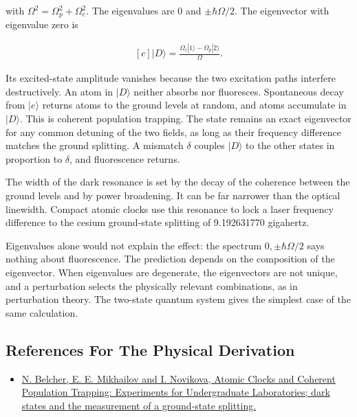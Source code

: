 \documentclass[11pt,oneside]{book}
\newenvironment{centeredalign}{\[\begin{gathered}[c]}{\end{gathered}\]}
\begin{document}
with \(\Omega^2=\Omega_p^2+\Omega_c^2\). The eigenvalues are \(0\) and \(\pm\hbar\Omega/2\). The eigenvector with eigenvalue zero is

\begin{centeredalign}
|D\rangle=\frac{\Omega_c|1\rangle-\Omega_p|2\rangle}{\Omega}.
\end{centeredalign}

Its excited-state amplitude vanishes because the two excitation paths interfere destructively. An atom in \(|D\rangle\) neither absorbs nor fluoresces. Spontaneous decay from \(|e\rangle\) returns atoms to the ground levels at random, and atoms accumulate in \(|D\rangle\). This is coherent population trapping. The state remains an exact eigenvector for any common detuning of the two fields, as long as their frequency difference matches the ground splitting. A mismatch \(\delta\) couples \(|D\rangle\) to the other states in proportion to \(\delta\), and fluorescence returns.

The width of the dark resonance is set by the decay of the coherence between the ground levels and by power broadening. It can be far narrower than the optical linewidth. Compact atomic clocks use this resonance to lock a laser frequency difference to the cesium ground-state splitting of 9.192631770 gigahertz.

Eigenvalues alone would not explain the effect: the spectrum \(0,\pm\hbar\Omega/2\) says nothing about fluorescence. The prediction depends on the composition of the eigenvector. When eigenvalues are degenerate, the eigenvectors are not unique, and a perturbation selects the physically relevant combinations, as in perturbation theory. The two-state quantum system gives the simplest case of the same calculation.

\subsection*{References For The Physical Derivation}
\begin{itemize}
\item \href{https://arxiv.org/abs/0810.2071}{N. Belcher, E. E. Mikhailov and I. Novikova, Atomic Clocks and Coherent Population Trapping: Experiments for Undergraduate Laboratories; dark states and the measurement of a ground-state splitting.}
\end{itemize}





\clearpage
\end{document}
